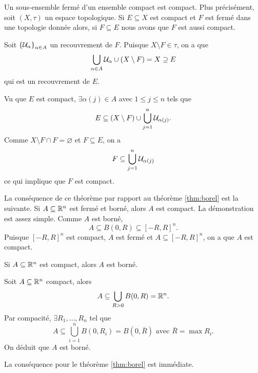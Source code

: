 \documentclass[french]{article}
\begin{document}
\begin{theoreme}
  Un sous-ensemble fermé d'un ensemble compact est compact. Plus précisément, soit $(X, \tau)$ un espace topologique. Si $E \subseteq X$ est compact et $F$ est fermé dans une topologie donnée alors, si $F \subseteq  E$ nous avons que $F$ est aussi compact.

  \tcblower
  \begin{preuve}
    Soit $\left\{ \mathcal{U}_\alpha \right\}_{\alpha \in A}$ un recouvrement de $F$. Puisque $X \setminus F \in \tau$, on a que
    $$\bigcup_{\alpha \in A} \mathcal{U}_\alpha \cup (X \setminus F) = X \supseteq E$$
    qui est un recouvrement de $E$.
    \par Vu que $E$ est compact, $\exists \alpha(j) \in  A$ avec $1 \leq j \leq n$ tels que
    $$E \subseteq (X \setminus F) \cup \bigcup_{j=1}^n \mathcal{U}_{\alpha(j)}.$$
    Comme $X \setminus F \cap F = \varnothing$ et $F \subseteq E$, on a
    $$F \subseteq \bigcup_{j=1}^n \mathcal{U}_{\alpha(j)}$$
    ce qui implique que $F$ est compact.
  \end{preuve}
\end{theoreme}

La conséquence de ce théorème par rapport au théorème \ref{thm:borel} est la suivante. Si $A \subseteq \mathbb{R}^n$ est fermé et borné, alors $A$ est compact. La démonstration est assez simple. Comme $A$ est borné,
$$A \subseteq B(0, R) \subseteq [-R, R]^n.$$ 
Puisque $[-R, R]^n$ est compact, $A$ est fermé et $A \subseteq [-R, R]^n$, on a que $A$ est compact.

\begin{propo}
  Si $A \subseteq \mathbb{R}^n$ est compact, alors $A$ est borné.

  \tcblower
  \begin{preuve}
    Soit $A \subseteq \mathbb{R}^n$ compact, alors
    $$A \subseteq \bigcup_{R>0} B(0, R) = \mathbb{R}^n.$$
    Par compacité, $\exists R_1, \dots, R_n$ tel que
    $$A \subseteq \bigcup_{i=1}^n B(0, R_i) = B(0, \bar{R}) \text{ avec } \bar{R} = \max R_i.$$
    On déduit que $A$ est borné.
  \end{preuve}
\end{propo}
La conséquence pour le théorème \ref{thm:borel} est immédiate.
\end{document}
